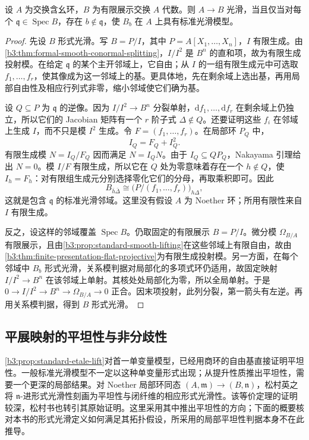 \begin{theorem}[光滑映射的局部标准形]\label{b3:thm:smooth-local-standard-form}
	设 \(A\) 为交换含幺环，\(B\) 为有限展示交换 \(A\) 代数。则 \(A\to B\) 光滑，当且仅当对每个 \(\mathfrak q\in\operatorname{Spec}B\)，存在 \(b\notin\mathfrak q\)，使 \(B_b\) 在 \(A\) 上具有标准光滑模型。
\end{theorem}
\begin{proof}
	先设 \(B\) 形式光滑。写 \(B=P/I\)，其中 \(P=A[X_1,\ldots,X_n]\)，\(I\) 有限生成。由\cref{b3:thm:formal-smooth-conormal-splitting}，\(I/I^2\) 是 \(B^n\) 的直和项，故为有限生成投射模。在给定 \(\mathfrak q\) 的某个主开邻域上，它自由；从 \(I\) 的一组有限生成元中可选取 \(f_1,\ldots,f_r\)，使其像成为这一邻域上的基。更具体地，先在剩余域上选出基，再用局部自由性及相应行列式非零，缩小邻域使它们确为基。

	设 \(Q\subseteq P\) 为 \(\mathfrak q\) 的逆像。因为 \(I/I^2\to B^n\) 分裂单射，\(\mathrm{d}f_1,\ldots,\mathrm{d}f_r\) 在剩余域上仍独立，所以它们的 Jacobian 矩阵有一个 \(r\) 阶子式 \(\Delta\notin Q\)。还要证明这些 \(f_i\) 在邻域上生成 \(I\)，而不只是模 \(I^2\) 生成。令 \(F=(f_1,\ldots,f_r)\)。在局部环 \(P_Q\) 中，
	\[
		I_Q=F_Q+I_Q^2.
	\]
	有限生成模 \(N=I_Q/F_Q\) 因而满足 \(N=I_QN\)。由于 \(I_Q\subseteq QP_Q\)，Nakayama 引理给出 \(N=0\)。模 \(I/F\) 有限生成，所以它在 \(Q\) 处为零意味着存在一个 \(h\notin Q\)，使 \(I_h=F_h\)：对有限组生成元分别选择零化它们的分母，再取乘积即可。因此
	\[
		B_{\bar h\bar\Delta} \cong\bigl(P/(f_1,\ldots,f_r)\bigr)_{h\Delta},
	\]
	这就是包含 \(\mathfrak q\) 的标准光滑邻域。这里没有假设 \(A\) 为 Noether 环；所用有限性来自 \(I\) 有限生成。

	反之，设这样的邻域覆盖 \(\operatorname{Spec}B\)。仍取固定的有限展示 \(B=P/I\)。微分模 \(\Omega_{B/A}\) 有限展示，且由\cref{b3:prop:standard-smooth-lifting}在这些邻域上有限自由，故由\cref{b3:thm:finite-presentation-flat-projective}为有限生成投射模。另一方面，在每个邻域中 \(B_b\) 形式光滑，关系模判据对局部化的多项式环仍适用，故固定映射 \(I/I^2\to B^n\) 在该邻域上单射。其核处处局部化为零，所以全局单射。于是 \(0\to I/I^2\to B^n\to\Omega_{B/A}\to0\) 正合。因末项投射，此列分裂，第一箭头有左逆。再用关系模判据，得到 \(B\) 形式光滑。
\end{proof}

\subsection{平展映射的平坦性与非分歧性}
\label{b3:subsec:2303:02}

\cref{b3:prop:standard-etale-lift}对首一单变量模型，已经用商环的自由基直接证明平坦性。一般标准光滑模型不一定以这种单变量形式出现；从提升性质推出平坦性，需要一个更深的局部结果。对 Noether 局部环同态 \((A,\mathfrak m)\to(B,\mathfrak n)\)，松村英之\cite[\S28, pp. 213--215; Theorem 28.9, p. 222]{Matsumura1989CommutativeRingTheory}将 \(\mathfrak n\)-进形式光滑性刻画为平坦性与闭纤维的相应形式光滑性。该等价定理的证明较深，松村书也转引其原始证明。这里采用其中推出平坦性的方向；下面的概要核对本书的形式光滑定义如何满足其拓扑假设，所采用的局部平坦性判据本身不在此推导。

